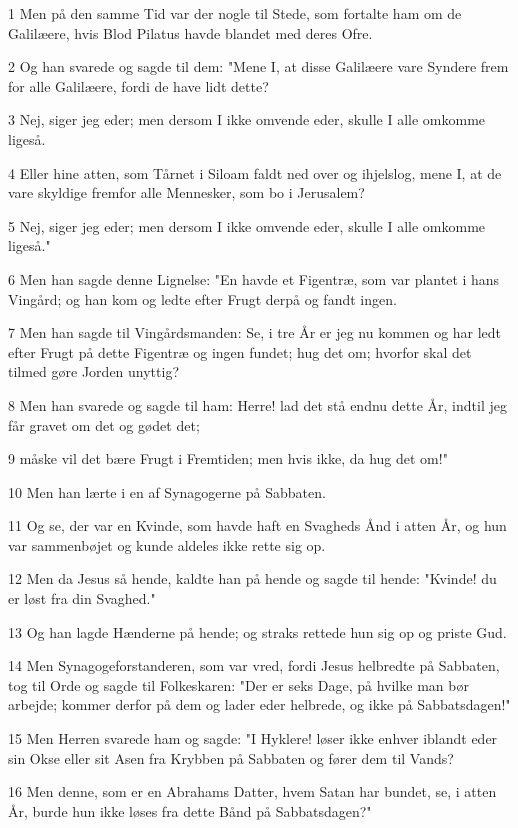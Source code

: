 \par 1 Men på den samme Tid var der nogle til Stede, som fortalte ham om de Galilæere, hvis Blod Pilatus havde blandet med deres Ofre.
\par 2 Og han svarede og sagde til dem: "Mene I, at disse Galilæere vare Syndere frem for alle Galilæere, fordi de have lidt dette?
\par 3 Nej, siger jeg eder; men dersom I ikke omvende eder, skulle I alle omkomme ligeså.
\par 4 Eller hine atten, som Tårnet i Siloam faldt ned over og ihjelslog, mene I, at de vare skyldige fremfor alle Mennesker, som bo i Jerusalem?
\par 5 Nej, siger jeg eder; men dersom I ikke omvende eder, skulle I alle omkomme ligeså."
\par 6 Men han sagde denne Lignelse: "En havde et Figentræ, som var plantet i hans Vingård; og han kom og ledte efter Frugt derpå og fandt ingen.
\par 7 Men han sagde til Vingårdsmanden: Se, i tre År er jeg nu kommen og har ledt efter Frugt på dette Figentræ og ingen fundet; hug det om; hvorfor skal det tilmed gøre Jorden unyttig?
\par 8 Men han svarede og sagde til ham: Herre! lad det stå endnu dette År, indtil jeg får gravet om det og gødet det;
\par 9 måske vil det bære Frugt i Fremtiden; men hvis ikke, da hug det om!"
\par 10 Men han lærte i en af Synagogerne på Sabbaten.
\par 11 Og se, der var en Kvinde, som havde haft en Svagheds Ånd i atten År, og hun var sammenbøjet og kunde aldeles ikke rette sig op.
\par 12 Men da Jesus så hende, kaldte han på hende og sagde til hende: "Kvinde! du er løst fra din Svaghed."
\par 13 Og han lagde Hænderne på hende; og straks rettede hun sig op og priste Gud.
\par 14 Men Synagogeforstanderen, som var vred, fordi Jesus helbredte på Sabbaten, tog til Orde og sagde til Folkeskaren: "Der er seks Dage, på hvilke man bør arbejde; kommer derfor på dem og lader eder helbrede, og ikke på Sabbatsdagen!"
\par 15 Men Herren svarede ham og sagde: "I Hyklere! løser ikke enhver iblandt eder sin Okse eller sit Asen fra Krybben på Sabbaten og fører dem til Vands?
\par 16 Men denne, som er en Abrahams Datter, hvem Satan har bundet, se, i atten År, burde hun ikke løses fra dette Bånd på Sabbatsdagen?"
